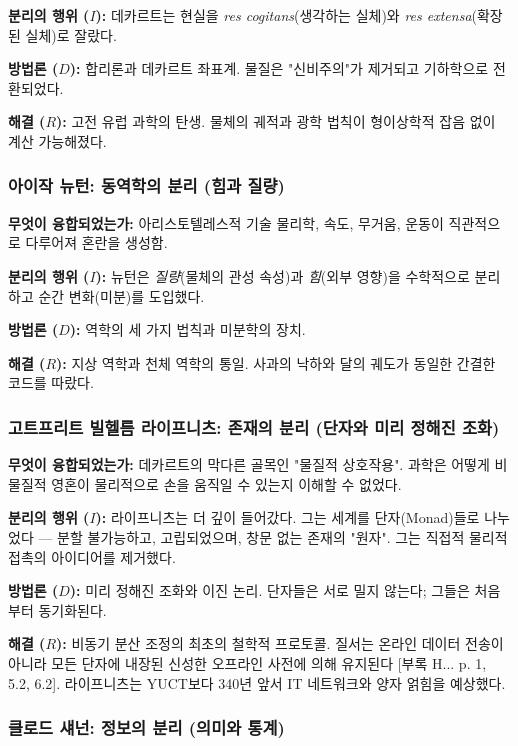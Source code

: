 \documentclass[12pt,a4paper]{article}
\begin{document}
	\textbf{분리의 행위 (\(I\)):} 데카르트는 현실을 \emph{res cogitans}(생각하는 실체)와 \emph{res extensa}(확장된 실체)로 잘랐다.
	
	\textbf{방법론 (\(D\)):} 합리론과 데카르트 좌표계. 물질은 "신비주의"가 제거되고 기하학으로 전환되었다.
	
	\textbf{해결 (\(R\)):} 고전 유럽 과학의 탄생. 물체의 궤적과 광학 법칙이 형이상학적 잡음 없이 계산 가능해졌다.
	
	\subsubsection{아이작 뉴턴: 동역학의 분리 (힘과 질량)}
	
	\textbf{무엇이 융합되었는가:} 아리스토텔레스적 기술 물리학, 속도, 무거움, 운동이 직관적으로 다루어져 혼란을 생성함.
	
	\textbf{분리의 행위 (\(I\)):} 뉴턴은 \emph{질량}(물체의 관성 속성)과 \emph{힘}(외부 영향)을 수학적으로 분리하고 순간 변화(미분)를 도입했다.
	
	\textbf{방법론 (\(D\)):} 역학의 세 가지 법칙과 미분학의 장치.
	
	\textbf{해결 (\(R\)):} 지상 역학과 천체 역학의 통일. 사과의 낙하와 달의 궤도가 동일한 간결한 코드를 따랐다.
	
	\subsubsection{고트프리트 빌헬름 라이프니츠: 존재의 분리 (단자와 미리 정해진 조화)}
	
	\textbf{무엇이 융합되었는가:} 데카르트의 막다른 골목인 "물질적 상호작용". 과학은 어떻게 비물질적 영혼이 물리적으로 손을 움직일 수 있는지 이해할 수 없었다.
	
	\textbf{분리의 행위 (\(I\)):} 라이프니츠는 더 깊이 들어갔다. 그는 세계를 단자(Monad)들로 나누었다 — 분할 불가능하고, 고립되었으며, 창문 없는 존재의 "원자". 그는 직접적 물리적 접촉의 아이디어를 제거했다.
	
	\textbf{방법론 (\(D\)):} 미리 정해진 조화와 이진 논리. 단자들은 서로 밀지 않는다; 그들은 처음부터 동기화된다.
	
	\textbf{해결 (\(R\)):} 비동기 분산 조정의 최초의 철학적 프로토콜. 질서는 온라인 데이터 전송이 아니라 모든 단자에 내장된 신성한 오프라인 사전에 의해 유지된다 [부록 H... p. 1, 5.2, 6.2]. 라이프니츠는 YUCT보다 340년 앞서 IT 네트워크와 양자 얽힘을 예상했다.
	
	\subsubsection{클로드 섀넌: 정보의 분리 (의미와 통계)}
	
\end{document}
